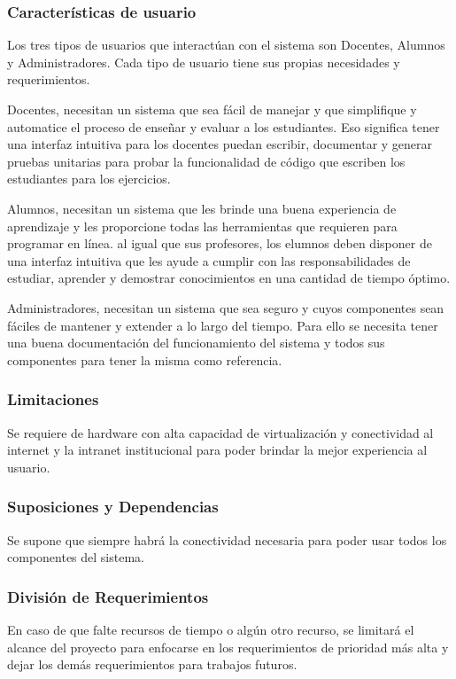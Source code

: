 \subsubsection{Características de usuario}
Los tres tipos de usuarios que interactúan con el sistema son Docentes, Alumnos y Administradores. Cada tipo de usuario tiene sus propias necesidades y requerimientos.

    
Docentes, necesitan un sistema que sea fácil de manejar y que simplifique y automatice el proceso de enseñar y evaluar a los estudiantes. Eso significa tener una interfaz intuitiva para los docentes puedan escribir, documentar y generar pruebas unitarias para probar la funcionalidad de código que escriben los estudiantes para los ejercicios.

 
Alumnos, necesitan un sistema que les brinde una buena experiencia de aprendizaje y les proporcione todas las herramientas que requieren para programar en línea. al igual que sus profesores, los elumnos deben disponer de una interfaz intuitiva que les ayude a cumplir con las responsabilidades de estudiar, aprender y demostrar conocimientos en una cantidad de tiempo óptimo.

Administradores, necesitan un sistema que sea seguro y cuyos componentes sean fáciles de mantener y extender a lo largo del tiempo. Para ello se necesita tener una buena documentación del funcionamiento del sistema y todos sus componentes para tener la misma como referencia.

\subsubsection{Limitaciones}
Se requiere de hardware con alta capacidad de virtualización y conectividad al internet y la intranet institucional para poder brindar la mejor experiencia al usuario.

\subsubsection{Suposiciones y Dependencias}
Se supone que siempre habrá la conectividad necesaria para poder usar todos los componentes del sistema.

\subsubsection{División de Requerimientos}
En caso de que falte recursos de tiempo o algún otro recurso, se limitará el alcance del proyecto para enfocarse en los requerimientos de prioridad más alta y dejar los demás requerimientos para trabajos futuros.

